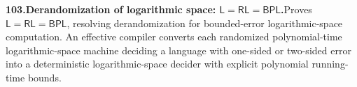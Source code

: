 \documentclass[11pt,a4paper]{article}
\begin{document}
  \par \begin{minipage}{\linewidth}
  \fontsize{10.5}{12.6}\selectfont\RaggedRight
  \hypertarget{result 103}{}
  {\bfseries\textcolor{muted}{103.}\enspace Derandomization of logarithmic space: $\mathsf L=\mathsf{RL}=\mathsf{BPL}$.}\enspace Proves $\mathsf L=\mathsf{RL}=\mathsf{BPL}$, resolving derandomization for bounded-error logarithmic-space computation. An effective compiler converts each randomized polynomial-time logarithmic-space machine deciding a language with one-sided or two-sided error into a deterministic logarithmic-space decider with explicit polynomial running-time bounds.\par
  \end{minipage}\par\vspace{5pt}
\end{document}
